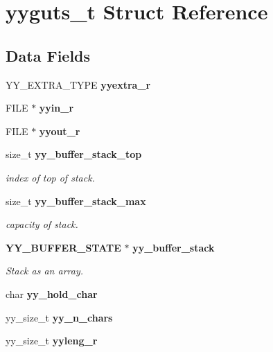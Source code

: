 \section{yyguts\+\_\+t Struct Reference}
\label{structyyguts__t}
\subsection*{Data Fields}
\begin{DoxyCompactItemize}
\item 
Y\+Y\+\_\+\+E\+X\+T\+R\+A\+\_\+\+T\+Y\+P\+E {\bfseries yyextra\+\_\+r}\label{structyyguts__t_aef05c0d6725a5214f6b30466f0b01c47}

\item 
F\+I\+L\+E $\ast$ {\bfseries yyin\+\_\+r}\label{structyyguts__t_a21f81ca100b12364a5095a37d1c6f650}

\item 
F\+I\+L\+E $\ast$ {\bfseries yyout\+\_\+r}\label{structyyguts__t_a436368a905aaf12e809e265749c74031}

\item 
size\+\_\+t {\bf yy\+\_\+buffer\+\_\+stack\+\_\+top}
\begin{DoxyCompactList}\small\item\em index of top of stack. \end{DoxyCompactList}\item 
size\+\_\+t {\bf yy\+\_\+buffer\+\_\+stack\+\_\+max}
\begin{DoxyCompactList}\small\item\em capacity of stack. \end{DoxyCompactList}\item 
{\bf Y\+Y\+\_\+\+B\+U\+F\+F\+E\+R\+\_\+\+S\+T\+A\+T\+E} $\ast$ {\bf yy\+\_\+buffer\+\_\+stack}
\begin{DoxyCompactList}\small\item\em Stack as an array. \end{DoxyCompactList}\item 
char {\bfseries yy\+\_\+hold\+\_\+char}\label{structyyguts__t_adde3f71374c223bbac47284824996e86}

\item 
yy\+\_\+size\+\_\+t {\bfseries yy\+\_\+n\+\_\+chars}\label{structyyguts__t_ac9eb8a4cedd3008b47b7644692b93a3f}

\item 
yy\+\_\+size\+\_\+t {\bfseries yyleng\+\_\+r}\label{structyyguts__t_ab55d594683be54bcd45a64c4bf26427e}


\end{DoxyCompactItemize}
